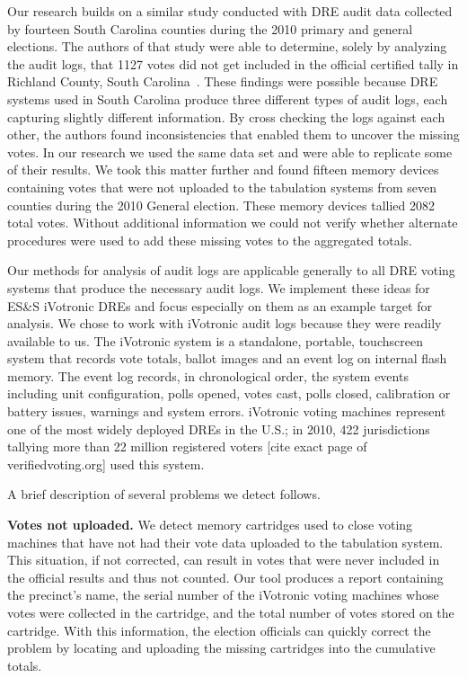 Our research builds on a similar study conducted with DRE audit data collected by fourteen South Carolina counties during the 2010 primary and general elections.  The authors of that study were able to determine, solely by analyzing the audit logs, that 1127 votes did not get included in the official certified tally in Richland County, South Carolina~\cite{Buell2011}. These findings were possible because DRE systems used in South Carolina produce three different types of audit logs, each capturing slightly different information. By cross checking the logs against each other, the authors found inconsistencies that enabled them to uncover the missing votes. In our research we used the same data set and were able to replicate some of their results. We took this matter further and found fifteen memory devices containing votes that were not uploaded to the tabulation systems from seven counties during the 2010 General election. These memory devices tallied 2082 total votes. Without additional information we could not verify whether alternate procedures were used to add these missing votes to the aggregated totals. 

Our methods for analysis of audit logs are applicable generally to all DRE voting systems  that produce the necessary audit logs. We implement these ideas for ES\&S iVotronic  DREs and focus especially on them as an example target for analysis.  We chose to work with iVotronic audit logs because they were readily available to us. The iVotronic system is a standalone, portable, touchscreen system that records vote totals, ballot images and an event log on internal flash memory. The event log records, in chronological order, the system events including unit configuration, polls opened, votes cast, polls closed, calibration or battery issues, warnings and system errors. iVotronic voting machines represent one of the most widely deployed DREs in the U.S.; in 2010, 422 jurisdictions tallying more than 22 million registered voters [cite exact page of verifiedvoting.org] used this system.
 
A brief description of several problems we detect follows.

\textbf{Votes not uploaded.} We detect  memory cartridges used to close voting machines that have not had their vote data uploaded to the tabulation system. This situation, if not corrected, can result in votes that were never included in the official results and thus not counted. Our tool produces a report containing the precinct's name, the serial number of the iVotronic voting machines whose votes were collected in the cartridge, and the total number of votes stored on the cartridge. With this information, the election officials can quickly correct the problem by locating and uploading the missing cartridges into the cumulative totals.

